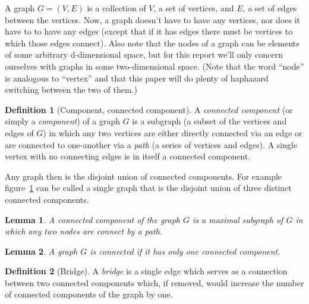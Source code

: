 \documentclass{amsart}
\theoremstyle{plain}
\newtheorem*{lemma}{Lemma}
\theoremstyle{remark}
\theoremstyle{definition}
\newtheorem*{definition}{Definition}
\begin{document}
A graph $G=(V,E)$ is a collection of $V$, a set of vertices, and $E$, a set of
edges between the vertices.
Now, a graph doesn't have to have any vertices, nor
does it have to to have any edges (except that if it has edges there must be
vertices to which those edges connect).
Also note that the nodes of a graph can be elements of some arbitrary
d-dimensional space, but for this report we'll only concern ourselves with
graphs in some two-dimensional space.
(Note that the word ``node'' is analogous to ``vertex'' and that this paper
will do plenty of haphazard switching between the two of them.)
\begin{definition}[Component, connected component]
  A \emph{connected component} (or simply a \emph{component}) of a graph $G$ is
  a subgraph (a subset of the vertices and edges of $G$) in which any two
  vertices are either directly connected via an edge or are connected to
  one-another via a \emph{path} (a series of vertices and edges). A single
  vertex with no connecting edges is in itself a connected component.
\end{definition}
Any graph then is the disjoint union of connected components.
For example figure~\ref{fig:disjoint-union} can be called a single graph that is the disjoint
union of three distinct connected components.
\begin{figure}[h]
  \caption[Disjoin union]{}
  \label{fig:disjoint-union}
\end{figure}
\begin{lemma}
  A connected component of the graph $G$ is a maximal subgraph of $G$ in which
  any two nodes are connect by a path.
\end{lemma}
\begin{lemma}
  A graph $G$ is \emph{connected} if it has only one connected component.
\end{lemma}
\begin{definition}[Bridge]
  A \emph{bridge} is a single edge which serves as a connection between two connected
  components which, if removed, would increase the number of connected
  components of the graph by one.
\end{definition}
\end{document}
